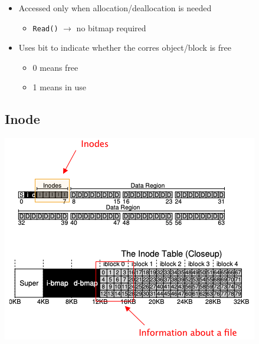 \documentclass[12pt]{article}
\begin{document}
\begin{itemize}
    \item Accessed only when allocation/deallocation is needed
    \begin{itemize}
        \item \texttt{Read()} $\to$ no bitmap required
    \end{itemize}
    \item Uses bit to indicate whether the corres object/block is free
    \begin{itemize}
        \item 0 means free
        \item 1 means in use
    \end{itemize}
\end{itemize}

\subsection{Inode}

\begin{center}
\includegraphics[width=\linewidth]{../images/midterm_2_solution_23.png}
\end{center}
\end{document}
